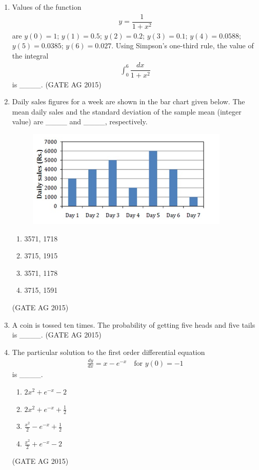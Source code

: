 \documentclass[journal,12pt,onecolumn]{IEEEtran}
\theoremstyle{remark}
\begin{document}
\begin{enumerate}
\item 
Values of the function
\begin{align*}
    y = \dfrac{1}{1+x^{2}} 
\end{align*}
are $y(0) = 1$; $y(1) = 0.5$; $y(2) = 0.2$; $y(3) = 0.1$; $y(4) = 0.0588$; $y(5) = 0.0385$; $y(6) = 0.027$. Using Simpson's one-third rule, the value of the integral 
\begin{align*}
    \int_{0}^{6} \dfrac{dx}{1+x^{2}}
\end{align*}
is \_\_\_\_.
\hfill{(GATE AG 2015)}

\item 
Daily sales figures for a week are shown in the bar chart given below. The mean daily sales and the standard deviation of the sample mean (integer value) are \_\_\_\_ and \_\_\_\_, respectively.

\begin{figure}[H]
    \centering
    \includegraphics[]{figs/Q.37.png}
    \caption{}
    \label{fig:2}
\end{figure}

\begin{multicols}{2}
\begin{enumerate}
    \item 3571, 1718
    \item 3715, 1915
    \item 3571, 1178
    \item 3715, 1591
\end{enumerate}
\end{multicols}
\hfill{(GATE AG 2015)}

\item 
A coin is tossed ten times. The probability of getting five heads and five tails is \_\_\_\_.
\hfill{(GATE AG 2015)}

\item 
The particular solution to the first order differential equation 
\begin{align*}
\frac{dy}{dx} = x - e^{-x} \quad \text{for } y(0) = -1
\end{align*}
is \_\_\_\_.
\begin{multicols}{4}
\begin{enumerate}
    \item $2x^{2} + e^{-x} - 2$
    \item $2x^{2} + e^{-x} + \tfrac{1}{2}$
    \item $\tfrac{x^{2}}{2} - e^{-x} + \tfrac{1}{2}$
    \item $\tfrac{x^{2}}{2} + e^{-x} - 2$
\end{enumerate}
\end{multicols}
\hfill{(GATE AG 2015)}


\end{enumerate}
\end{document}
